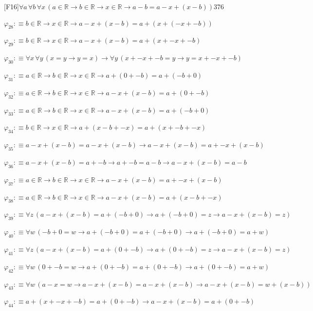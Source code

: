 \begin{fullproof}{[F16]}{$\forall a\,\forall b\,\forall x\,(a \in \mathbb{R} \to b \in \mathbb{R} \to x \in \mathbb{R} \to a - b = a - x + (x - b))$}{376}
\begin{abbrevlist}
\item $\varphi_{28} :\equiv b \in \mathbb{R} \to x \in \mathbb{R} \to a - x + (x - b) = a + (x + (-x + -b))$
\item $\varphi_{29} :\equiv b \in \mathbb{R} \to x \in \mathbb{R} \to a - x + (x - b) = a + (x + -x + -b)$
\item $\varphi_{30} :\equiv \forall x\,\forall y\,(x = y \to y = x) \to \forall y\,(x + -x + -b = y \to y = x + -x + -b)$
\item $\varphi_{31} :\equiv a \in \mathbb{R} \to b \in \mathbb{R} \to x \in \mathbb{R} \to a + (0 + -b) = a + (-b + 0)$
\item $\varphi_{32} :\equiv a \in \mathbb{R} \to b \in \mathbb{R} \to x \in \mathbb{R} \to a - x + (x - b) = a + (0 + -b)$
\item $\varphi_{33} :\equiv a \in \mathbb{R} \to b \in \mathbb{R} \to x \in \mathbb{R} \to a - x + (x - b) = a + (-b + 0)$
\item $\varphi_{34} :\equiv b \in \mathbb{R} \to x \in \mathbb{R} \to a + (x - b + -x) = a + (x + -b + -x)$
\item $\varphi_{35} :\equiv a - x + (x - b) = a - x + (x - b) \to a - x + (x - b) = a + -x + (x - b)$
\item $\varphi_{36} :\equiv a - x + (x - b) = a + -b \to a + -b = a - b \to a - x + (x - b) = a - b$
\item $\varphi_{37} :\equiv a \in \mathbb{R} \to b \in \mathbb{R} \to x \in \mathbb{R} \to a - x + (x - b) = a + -x + (x - b)$
\item $\varphi_{38} :\equiv a \in \mathbb{R} \to b \in \mathbb{R} \to x \in \mathbb{R} \to a - x + (x - b) = a + (x - b + -x)$
\item $\varphi_{39} :\equiv \forall z\,(a - x + (x - b) = a + (-b + 0) \to a + (-b + 0) = z \to a - x + (x - b) = z)$
\item $\varphi_{40} :\equiv \forall w\,(-b + 0 = w \to a + (-b + 0) = a + (-b + 0) \to a + (-b + 0) = a + w)$
\item $\varphi_{41} :\equiv \forall z\,(a - x + (x - b) = a + (0 + -b) \to a + (0 + -b) = z \to a - x + (x - b) = z)$
\item $\varphi_{42} :\equiv \forall w\,(0 + -b = w \to a + (0 + -b) = a + (0 + -b) \to a + (0 + -b) = a + w)$
\item $\varphi_{43} :\equiv \forall w\,(a - x = w \to a - x + (x - b) = a - x + (x - b) \to a - x + (x - b) = w + (x - b))$
\item $\varphi_{44} :\equiv a + (x + -x + -b) = a + (0 + -b) \to a - x + (x - b) = a + (0 + -b)$

\end{abbrevlist}
\end{fullproof}
